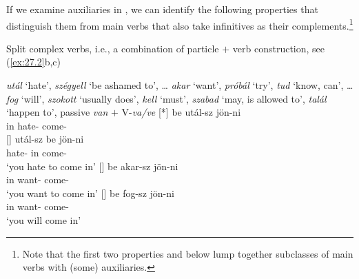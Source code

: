 \documentclass[output=paper]{langsci/langscibook}
\begin{document}
If we examine auxiliaries in , we can identify the following
properties that distinguish them from main verbs that also take infinitives as
their complements.\footnote{Note that the first two properties 
    and  below lump together subclasses of main verbs with (some)
auxiliaries.}\largerpage[-2]

\begin{exe}\label{ex:27.2}
    \ex Split complex verbs, i.e., a combination of particle $+$ verb
    construction, see (\ref{ex:27.2}b,c)\footnotemark
    \begin{xlist}
     \emph{utál} ‘hate’, \emph{szégyell} ‘be ashamed to’, \dots{}
     \emph{akar} ‘want’, \emph{próbál} ‘try’, \emph{tud} ‘know, can’,
        \dots{}
     \emph{fog} ‘will’, \emph{szokott} ‘usually does’, \emph{kell}
        ‘must’, \emph{szabad} ‘may, is allowed to’, \emph{talál} ‘happen to’,
        passive \emph{van} $+$ V-\emph{va/ve}
    [*]{%
        \gll    be   utál-sz     jön-ni \\
                in    hate-\Ssg{}  come-\Inf{}\\}
    []{%
        \gll    utál-sz    be jön-ni \\
                hate-\Ssg{}  in   come-\Inf{}\\
        \glt    ‘you hate to come in’}
    []{%
        \gll    be   akar-sz     jön-ni\\
                in    want-\Ssg{}  come-\Inf{}\\
        \glt    ‘you want to come in’}
    []{%
        \gll    be   fog-sz    jön-ni\\
                in    want-\Ssg{}  come-\Inf{}\\
        \glt    ‘you will come in’}
    \end{xlist}
\end{exe}
\end{document}
